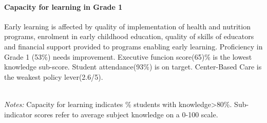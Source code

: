 \documentclass[twocolumn]{article}
\let\oldparagraph\paragraph
\renewcommand{\paragraph}[1]{\oldparagraph{#1}\mbox{}}
\begin{document}
\hypertarget{capacity-for-learning-in-grade-1}{%
\paragraph{\texorpdfstring{\textbf{Capacity for learning in Grade
1}}{Capacity for learning in Grade 1}}\label{capacity-for-learning-in-grade-1}}

Early learning is affected by quality of implementation of health and
nutrition programs, enrolment in early childhood education, quality of
skills of educators and financial support provided to programs enabling
early learning. Proficiency in Grade 1 (53\%) needs improvement.
Executive funcion score(65)\% is the lowest knowledge sub-score. Student
attendance(93\%) is on target. Center-Based Care is the weakest policy
lever(2.6/5).

\begin{table}[H]
\\
\color{darkgray}\scriptsize{\textit{Notes:} Capacity for learning indicates \% students with knowledge\textgreater{80\%}. Sub-indicator scores refer to average subject knowledge on a 0-100 scale.}
\end{table}
\raggedbottom
\end{document}
